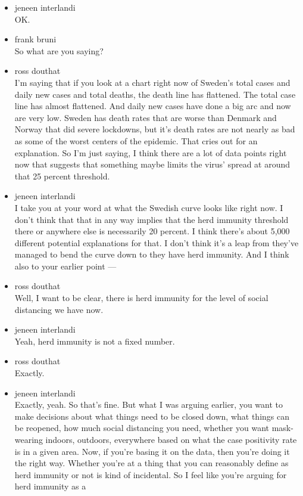 \begin{itemize}
\item
  jeneen interlandi\\
  OK.
\item
  frank bruni\\
  So what are you saying?
\item
  ross douthat\\
  I'm saying that if you look at a chart right now of Sweden's total
  cases and daily new cases and total deaths, the death line has
  flattened. The total case line has almost flattened. And daily new
  cases have done a big arc and now are very low. Sweden has death rates
  that are worse than Denmark and Norway that did severe lockdowns, but
  it's death rates are not nearly as bad as some of the worst centers of
  the epidemic. That cries out for an explanation. So I'm just saying, I
  think there are a lot of data points right now that suggests that
  something maybe limits the virus' spread at around that 25 percent
  threshold.
\item
  jeneen interlandi\\
  I take you at your word at what the Swedish curve looks like right
  now. I don't think that that in any way implies that the herd immunity
  threshold there or anywhere else is necessarily 20 percent. I think
  there's about 5,000 different potential explanations for that. I don't
  think it's a leap from they've managed to bend the curve down to they
  have herd immunity. And I think also to your earlier point ---
\item
  ross douthat\\
  Well, I want to be clear, there is herd immunity for the level of
  social distancing we have now.
\item
  jeneen interlandi\\
  Yeah, herd immunity is not a fixed number.
\item
  ross douthat\\
  Exactly.
\item
  jeneen interlandi\\
  Exactly, yeah. So that's fine. But what I was arguing earlier, you
  want to make decisions about what things need to be closed down, what
  things can be reopened, how much social distancing you need, whether
  you want mask-wearing indoors, outdoors, everywhere based on what the
  case positivity rate is in a given area. Now, if you're basing it on
  the data, then you're doing it the right way. Whether you're at a
  thing that you can reasonably define as herd immunity or not is kind
  of incidental. So I feel like you're arguing for herd immunity as a

\end{itemize}
